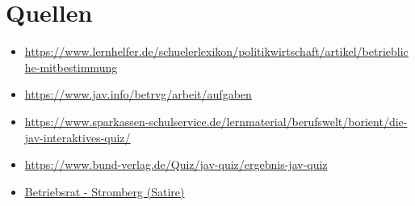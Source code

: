 \documentclass[
  a4paper,            %
  DIV=10,             %
  oneside,            %
  BCOR=5mm,           %
  parskip=half,       %
  numbers=noenddot    %
]{scrartcl}
\begin{document}
\section{Quellen}
\begin{itemize}
	\item 
	\url{https://www.lernhelfer.de/schuelerlexikon/politikwirtschaft/artikel/betriebliche-mitbestimmung }
	\item 
	\url{https://www.jav.info/betrvg/arbeit/aufgaben}
	\item
	\url{https://www.sparkassen-schulservice.de/lernmaterial/berufswelt/borient/die-jav-interaktives-quiz/}
	\item 
	\url{https://www.bund-verlag.de/Quiz/jav-quiz/ergebnis-jav-quiz}
	\item
	\href{https://youtu.be/GS_Ea9SezAs}{Betriebsrat - Stromberg (Satire)}
\end{itemize}

%
%

\clearpage
\end{document}

